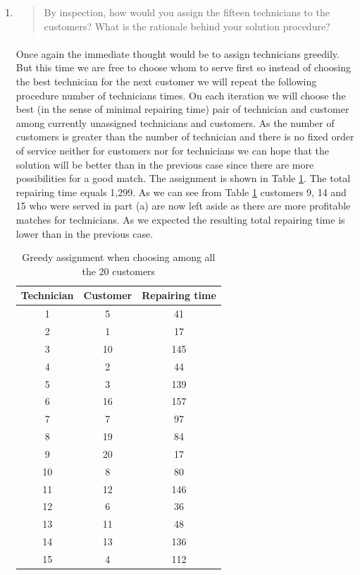 \begin{enumerate}[(a)]
\begin{enumerate}[1.]
\item\begin{quote}By inspection, how would you assign the fifteen technicians to the customers?
What is the rationale behind your solution procedure?\end{quote}

	\paragraph{}
	Once again the immediate thought would be to assign technicians greedily. But this time we are free to choose whom to serve first so instead of choosing the best technician for the next customer we will repeat the following procedure number of technicians times. On each iteration we will choose the best (in the sense of minimal repairing time) pair of technician and customer among currently unassigned technicians and customers. As the number of customers is greater than the number of technician and there is no fixed order of service neither for customers nor for technicians we can hope that the solution will be better than in the previous case since there are more possibilities for a good match. The assignment is shown in Table \ref{greedy-1-b}. The total repairing time equals 1,299. As we can see from Table \ref{greedy-1-b} customers 9, 14 and 15 who were served in part (a) are now left aside as there are more profitable matches for technicians. As we expected the resulting total repairing time is lower than in the previous case.

\begin{table}[H]
	\centering
	\caption{Greedy assignment when choosing among all the 20 customers}
	\begin{tabular}{|c|c|c|}\hline
Technician & Customer & Repairing time \\ \hline
1 & 5 & 41 \\
2 & 1 & 17 \\
3 & 10 & 145 \\
4 & 2 & 44 \\
5 & 3 & 139 \\
6 & 16 & 157 \\
7 & 7 & 97 \\
8 & 19 & 84 \\
9 & 20 & 17 \\
10 & 8 & 80 \\
11 & 12 & 146 \\
12 & 6 & 36 \\
13 & 11 & 48 \\
14 & 13 & 136 \\
15 & 4 & 112 \\
\hline
	\end{tabular}
	\label{greedy-1-b}
\end{table}



\end{enumerate}
\end{enumerate}
